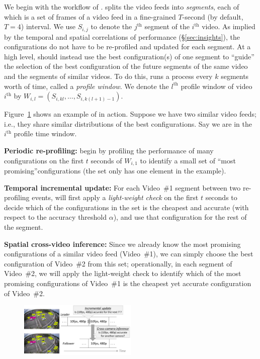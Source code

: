 We begin with the workflow of \name.
\name splits the video feeds into {\em segments}, each 
of which is a set of frames of a video feed in a fine-grained 
$T$-second (by default, $T=4$) interval. 
We use $S_{i,j}$ to denote the $j^\textrm{th}$ segment of the
$i^\textrm{th}$ video.
As implied by the temporal and spatial correlations of \nn 
performance (\S\ref{sec:insights}), the \nn configurations do 
not have to be re-profiled and updated for each segment.
At a high level, \name should instead use the best 
configuration(s) of one segment to ``guide'' the selection of 
the best configuration of the future segments of the same 
video and the segments of similar videos. 
To do this, \name runs a process every $k$ 
segments worth of time, called a {\em profile window}. 
We denote the $l^\textrm{th}$ profile window of video 
$i^\textrm{th}$ by $W_{i,l}=(S_{i,kl},\dots,S_{i,k(l+1)-1})$.


Figure~\ref{fig:workflow} shows an example of \name in action.
Suppose we have two similar video feeds; i.e., they share 
similar distributions of the best \nn configurations.
Say we are in the $i^\textrm{th}$ profile time window.
\begin{packeditemize}
\item {\bf Periodic re-profiling:}
\name begin by profiling the performance of many configurations 
on the first $t$ seconds of $W_{i,1}$ to identify
a small set of ``most promising''configurations (the set only has
one element in the example).
\item {\bf  Temporal incremental update:} 
For each Video~\#1 segment between two re-profiling events, 
\name will first apply a {\em light-weight check} on the first 
$t$ seconds to decide which of the configurations in the set is 
the cheapest and accurate (with respect to the accuracy 
threshold $\alpha$), and use that configuration for the rest of 
the segment.
\item {\bf Spatial cross-video inference:}
Since we already know the most promising configurations of a 
similar video feed (Video~\#1), we can simply choose the best 
configuration of Video~\#2 from this set;
operationally, in each segment of Video~\#2, we will apply the
light-weight check to identify which of the most promising 
configurations of Video~\#1 is the cheapest yet  accurate 
configuration of Video~\#2.
\end{packeditemize}

\begin{figure}[t!]
\centering
\includegraphics[width=0.5\textwidth]{PaperFigures/Workflow.pdf}
\vspace{-0.2cm}
\label{fig:workflow}
\end{figure}

